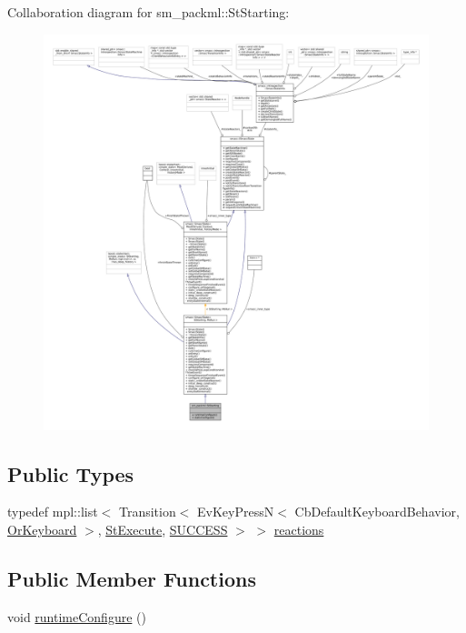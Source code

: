 Collaboration diagram for sm\+\_\+packml\+:\+:St\+Starting\+:
\nopagebreak
\begin{figure}[H]
\begin{center}
\leavevmode
\includegraphics[width=350pt]{structsm__packml_1_1StStarting__coll__graph}
\end{center}
\end{figure}
\subsection*{Public Types}
\begin{DoxyCompactItemize}
\item 
typedef mpl\+::list$<$ Transition$<$ Ev\+Key\+PressN$<$ Cb\+Default\+Keyboard\+Behavior, \hyperlink{classsm__packml_1_1OrKeyboard}{Or\+Keyboard} $>$, \hyperlink{structsm__packml_1_1StExecute}{St\+Execute}, \hyperlink{classSUCCESS}{S\+U\+C\+C\+E\+SS} $>$ $>$ \hyperlink{structsm__packml_1_1StStarting_a5874175ff382d18ac532b2ceeda18c8b}{reactions}
\end{DoxyCompactItemize}
\subsection*{Public Member Functions}
\begin{DoxyCompactItemize}
\item 
void \hyperlink{structsm__packml_1_1StStarting_ac300462fece8c35773780ac356c29653}{runtime\+Configure} ()
\end{DoxyCompactItemize}
